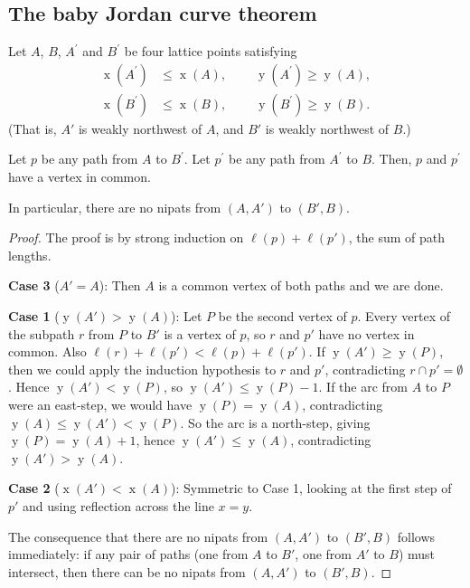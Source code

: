 \subsection{The baby Jordan curve theorem}

\begin{proposition}
\label{prop.lgv.jordan-2}
\leantarget
\leanok
Let $A$, $B$, $A^{\prime}$
and $B^{\prime}$ be four lattice points satisfying
\begin{align*}
\operatorname{x}\left(  A^{\prime}\right)   &  \leq\operatorname{x}\left(
A\right)  ,\ \ \ \ \ \ \ \ \ \ \operatorname{y}\left(  A^{\prime}\right)
\geq\operatorname{y}\left(  A\right)  ,\\
\operatorname{x}\left(  B^{\prime}\right)   &  \leq\operatorname{x}\left(
B\right)  ,\ \ \ \ \ \ \ \ \ \ \operatorname{y}\left(  B^{\prime}\right)
\geq\operatorname{y}\left(  B\right)  .
\end{align*}
(That is, $A'$ is weakly northwest of $A$, and $B'$ is weakly northwest
of $B$.)

Let $p$ be any path from $A$ to $B^{\prime}$. Let $p^{\prime}$ be any path
from $A^{\prime}$ to $B$. Then, $p$ and $p^{\prime}$ have a vertex in common.

In particular, there are no nipats from $(A, A')$ to $(B', B)$.
\end{proposition}

\begin{proof}
The proof is by strong induction on $\ell(p) + \ell(p')$, the sum of
path lengths.

\textbf{Case 3} ($A' = A$): Then $A$ is a common vertex of both
paths and we are done.

\textbf{Case 1} ($\operatorname{y}(A') > \operatorname{y}(A)$):
Let $P$ be the second vertex of $p$. Every vertex of the
subpath $r$ from $P$ to $B'$ is a vertex of $p$, so $r$ and $p'$
have no vertex in common. Also $\ell(r) + \ell(p') < \ell(p) + \ell(p')$.
If $\operatorname{y}(A') \ge \operatorname{y}(P)$, then we could apply
the induction hypothesis to $r$ and $p'$, contradicting $r \cap p' = \emptyset$.
Hence $\operatorname{y}(A') < \operatorname{y}(P)$, so
$\operatorname{y}(A') \le \operatorname{y}(P) - 1$. If the arc from $A$ to $P$
were an east-step, we would have $\operatorname{y}(P) = \operatorname{y}(A)$,
contradicting $\operatorname{y}(A) \le \operatorname{y}(A') < \operatorname{y}(P)$.
So the arc is a north-step, giving $\operatorname{y}(P) = \operatorname{y}(A) + 1$,
hence $\operatorname{y}(A') \le \operatorname{y}(A)$,
contradicting $\operatorname{y}(A') > \operatorname{y}(A)$.

\textbf{Case 2} ($\operatorname{x}(A') < \operatorname{x}(A)$): Symmetric
to Case 1, looking at the first step of $p'$ and using reflection
across the line $x = y$.

The consequence that there are no nipats from $(A, A')$ to $(B', B)$
follows immediately: if any pair of paths (one from $A$ to $B'$, one from
$A'$ to $B$) must intersect, then there can be no nipats from $(A, A')$
to $(B', B)$.
\end{proof}

